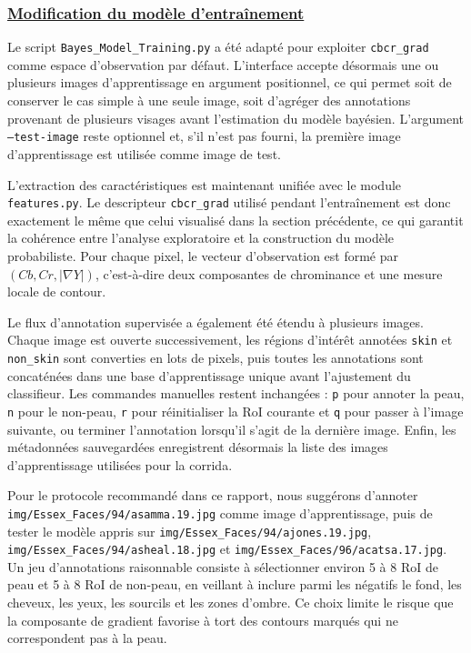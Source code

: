 \subsubsection{\underline{\textbf{Modification du mod\`ele d'entra\^inement}}}

Le script \texttt{Bayes\_Model\_Training.py} a \'et\'e adapt\'e pour exploiter \texttt{cbcr\_grad} comme espace d'observation par d\'efaut. L'interface accepte d\'esormais une ou plusieurs images d'apprentissage en argument positionnel, ce qui permet soit de conserver le cas simple \`a une seule image, soit d'agr\'eger des annotations provenant de plusieurs visages avant l'estimation du mod\`ele bay\'esien. L'argument \texttt{--test-image} reste optionnel et, s'il n'est pas fourni, la premi\`ere image d'apprentissage est utilis\'ee comme image de test.

L'extraction des caract\'eristiques est maintenant unifi\'ee avec le module \texttt{features.py}. Le descripteur \texttt{cbcr\_grad} utilis\'e pendant l'entra\^inement est donc exactement le m\^eme que celui visualis\'e dans la section pr\'ec\'edente, ce qui garantit la coh\'erence entre l'analyse exploratoire et la construction du mod\`ele probabiliste. Pour chaque pixel, le vecteur d'observation est form\'e par \((Cb, Cr, |\nabla Y|)\), c'est-\`a-dire deux composantes de chrominance et une mesure locale de contour.

Le flux d'annotation supervis\'ee a \'egalement \'et\'e \'etendu \`a plusieurs images. Chaque image est ouverte successivement, les r\'egions d'int\'er\^et annot\'ees \texttt{skin} et \texttt{non\_skin} sont converties en lots de pixels, puis toutes les annotations sont concat\'en\'ees dans une base d'apprentissage unique avant l'ajustement du classifieur. Les commandes manuelles restent inchang\'ees : \texttt{p} pour annoter la peau, \texttt{n} pour le non-peau, \texttt{r} pour r\'einitialiser la RoI courante et \texttt{q} pour passer \`a l'image suivante, ou terminer l'annotation lorsqu'il s'agit de la derni\`ere image. Enfin, les m\'etadonn\'ees sauvegard\'ees enregistrent d\'esormais la liste des images d'apprentissage utilis\'ees pour la corrida.

Pour le protocole recommand\'e dans ce rapport, nous sugg\'erons d'annoter \texttt{img/Essex\_Faces/94/asamma.19.jpg} comme image d'apprentissage, puis de tester le mod\`ele appris sur \texttt{img/Essex\_Faces/94/ajones.19.jpg}, \texttt{img/Essex\_Faces/94/asheal.18.jpg}
et \texttt{img/Essex\_Faces/96/acatsa.17.jpg}. Un jeu d'annotations raisonnable consiste \`a s\'electionner environ 5 \`a 8 RoI de peau et 5 \`a 8 RoI de non-peau, en veillant \`a inclure parmi les n\'egatifs le fond, les cheveux, les yeux, les sourcils et les zones d'ombre. Ce choix limite le risque que la composante de gradient favorise \`a tort des contours marqu\'es qui ne correspondent pas \`a la peau.

